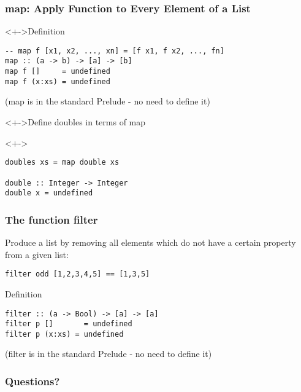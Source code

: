 \documentclass{beamer}
\begin{document}
\begin{frame}[fragile]
  \frametitle{map: Apply Function to Every Element of a List}
  \begin{block}<+->{Definition}
\begin{lstlisting}
-- map f [x1, x2, ..., xn] = [f x1, f x2, ..., fn]
map :: (a -> b) -> [a] -> [b]
map f []     = undefined
map f (x:xs) = undefined
\end{lstlisting}
    (map is in the standard Prelude - no need to define it)
  \end{block}
  \begin{alertblock}<+->{Define doubles in terms of map}
  \end{alertblock}
  \begin{block}<+->{}
\begin{lstlisting}
doubles xs = map double xs

double :: Integer -> Integer
double x = undefined
\end{lstlisting}
  \end{block}
\end{frame}
\begin{frame}[fragile]
  \frametitle{The function filter}
  Produce a list by removing all elements 
  which do not have a certain property from 
  a given list: 

\begin{lstlisting}
filter odd [1,2,3,4,5] == [1,3,5]
\end{lstlisting}

  \begin{block}{Definition}
\begin{lstlisting}
filter :: (a -> Bool) -> [a] -> [a]
filter p []       = undefined
filter p (x:xs) = undefined
\end{lstlisting}
(filter is in the standard Prelude - no need to define it)
  \end{block}
\end{frame}

\begin{frame}
  \frametitle{Questions?}
  \begin{center}
  \end{center}
\end{frame}
\end{document}
